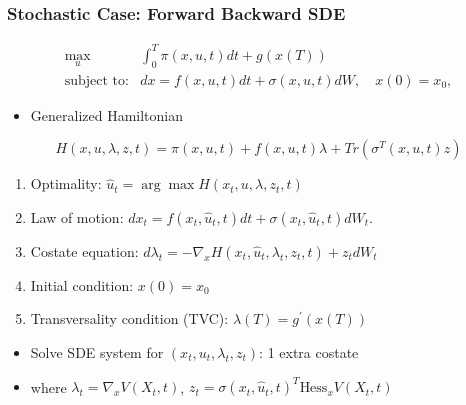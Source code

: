 \documentclass[bigger,handout]{beamer}
\begin{document}
\begin{frame}%

\frametitle{Stochastic Case: Forward Backward SDE}

\begin{equation*}
\begin{array}{rc}
\max_{u} & \int_{0}^{T}\pi (x,u,t)dt+g(x(T)) \\
\text{subject to:} & dx=f(x,u,t)dt+\sigma(x,u,t)dW,\quad x(0)=x_{0},%
\end{array}%
\end{equation*}%


\begin{itemize}
\item Generalized Hamiltonian
\end{itemize}
\begin{equation*}
H(x,u,\lambda,z,t) = \pi(x,u,t)+f(x,u,t)\lambda+Tr(\sigma^{T}(x,u,t)z)
\end{equation*}
\begin{enumerate}
\item Optimality: $\hat{u}_t=\arg\max H(x_t,u,\lambda,z_t,t)$

\item Law of motion: $dx_t=f(x_t,\hat{u}_t,t)dt+\sigma(x_t,\hat{u}_t,t)dW_t$.
 
\item Costate equation: $d\lambda_{t}=-\nabla_{x}H(x_t,\hat{u}_t,\lambda_t,z_t,t)+z_{t}dW_t$
\item Initial condition: $x(0)=x_{0}$
\item Transversality condition (TVC): $\lambda (T)=g^{\prime }(x(T))$

\end{enumerate}

\begin{itemize}
\item Solve SDE system for $(x_t,u_t,\lambda_t,z_t)$: 1 extra costate
\item where $\lambda_t=\nabla_{x}V(X_t,t)$, $z_t=\sigma(x_t,\hat{u}_t,t)^{T}\text{Hess}_{x}V(X_t,t)$
\end{itemize}



\end{frame}

% 
% 
% 
% 
 
\end{document}

